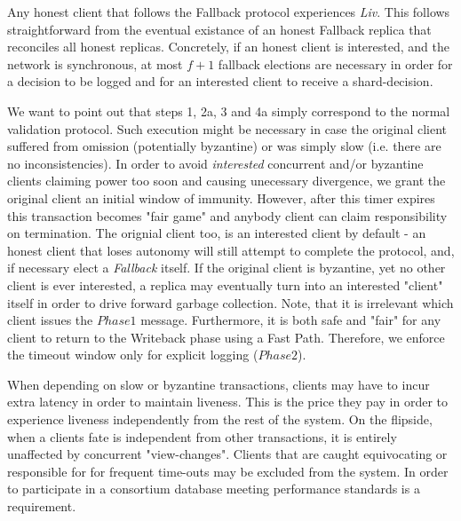 
Any honest client that follows the Fallback protocol experiences \textit{Liv}. This follows straightforward from the eventual existance of an honest Fallback replica that reconciles all honest replicas. Concretely, if an honest client is interested, and the network is synchronous, at most $f+1$ fallback elections are necessary in order for a decision to be logged and for an interested client to receive a shard-decision.


We want to point out that steps 1, 2a, 3 and 4a simply correspond to the normal validation protocol. Such execution might be necessary in case the original client suffered from omission (potentially byzantine) or was simply slow (i.e. there are no inconsistencies). In order to avoid \textit{interested} concurrent and/or byzantine clients claiming power too soon and causing unecessary divergence, we grant the original client an initial window of immunity.
However, after this timer expires this transaction becomes "fair game" and anybody client can claim responsibility on termination. The orignial client too, is an interested client by default - an honest client that loses autonomy will still attempt to complete the protocol, and, if necessary elect a \textit{Fallback} itself. If the original client is byzantine, yet no other client is ever interested, a replica may eventually turn into an interested "client" itself in order to drive forward garbage collection.
Note, that it is irrelevant which client issues the $Phase1$ message. Furthermore, it is both safe and "fair" for any client to return to the Writeback phase using a Fast Path. Therefore, we enforce the timeout window only for explicit logging ($Phase2$). 

When depending on slow or byzantine transactions, clients may have to incur extra latency in order to maintain liveness. 
This is the price they pay in order to experience liveness independently from the rest of the system. On the flipside, when a clients fate is independent from other transactions, it is entirely unaffected by concurrent "view-changes". Clients that are caught equivocating or responsible for for frequent time-outs may be excluded from the system. In order to participate in a consortium database meeting performance standards is a requirement.

